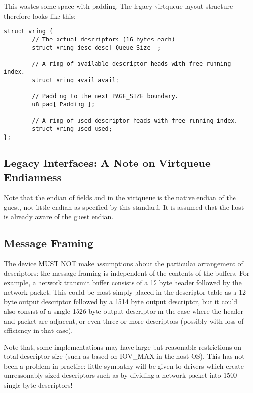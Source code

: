 This wastes some space with padding.
The legacy virtqueue layout structure therefore looks like this:

\begin{lstlisting}
struct vring {
        // The actual descriptors (16 bytes each)
        struct vring_desc desc[ Queue Size ];

        // A ring of available descriptor heads with free-running index.
        struct vring_avail avail;

        // Padding to the next PAGE_SIZE boundary.
        u8 pad[ Padding ];

        // A ring of used descriptor heads with free-running index.
        struct vring_used used;
};
\end{lstlisting}

\subsection{Legacy Interfaces: A Note on Virtqueue Endianness}\label{sec:Basic Facilities of a Virtio Device / Virtqueues / Legacy Interfaces: A Note on Virtqueue Endianness}

Note that the endian of fields and in the virtqueue is the native
endian of the guest, not little-endian as specified by this standard.
It is assumed that the host is already aware of the guest endian.

\subsection{Message Framing}\label{sec:Basic Facilities of a Virtio Device / Virtqueues / Message Framing}
The device MUST NOT make assumptions about the particular arrangement
of descriptors: the message framing is
independent of the contents of the buffers. For example, a network
transmit buffer consists of a 12 byte header followed by the network
packet. This could be most simply placed in the descriptor table as a
12 byte output descriptor followed by a 1514 byte output descriptor,
but it could also consist of a single 1526 byte output descriptor in
the case where the header and packet are adjacent, or even three or
more descriptors (possibly with loss of efficiency in that case).

Note that, some implementations may have large-but-reasonable
restrictions on total descriptor size (such as based on IOV_MAX in the
host OS). This has not been a problem in practice: little sympathy
will be given to drivers which create unreasonably-sized descriptors
such as by dividing a network packet into 1500 single-byte
descriptors!

